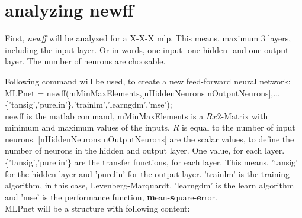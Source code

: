 \section{analyzing newff}
First, \textit{newff} will be analyzed for a X-X-X mlp. This means, maximum 3 layers, including the input layer. Or in words, one input- one hidden- and one output-layer. The number of neurons are choosable.

Following command will be used, to create a new feed-forward neural network:\\
\noindent MLPnet = newff(mMinMaxElements,[nHiddenNeurons nOutputNeurons],...\newline
\{'tansig','purelin'\},'trainlm','learngdm','mse');\\

newff is the matlab command, mMinMaxElements is a $Rx2$-Matrix with minimum and maximum values of the inputs. $R$ is equal to the number of input neurons. [nHiddenNeurons nOutputNeurons] are the scalar values, to define the number of neurons in the hidden and output layer. One value, for each layer. \{'tansig','purelin'\} are the transfer functions, for each layer. This means, 'tansig' for the hidden layer and 'purelin' for the output layer. 'trainlm' is the training algorithm, in this case, Levenberg-Marquardt. 'learngdm' is the learn algorithm and 'mse' is the performance function, \textbf{m}ean-\textbf{s}quare-\textbf{e}rror.\\
MLPnet will be a structure with following content:

